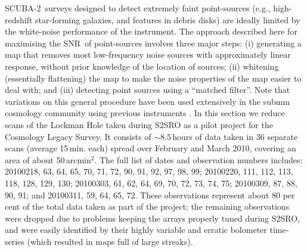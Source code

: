 \documentclass[useAMS,usenatbib,nofootinbib]{mn2e}
\newcommand{\snr}{SNR}
\newcommand{\scuba}{SCUBA-2}
\begin{document}
\scuba\ surveys designed to detect extremely faint point-sources
(e.g., high-redshift star-forming galaxies, and features in debris
disks) are ideally limited by the white-noise performance of the
instrument. The approach described here for maximising the \snr\ of
point-sources involves three major steps: (i) generating a map that
removes most low-frequency noise sources with approximately linear
response, without prior knowledge of the location of sources; (ii)
whitening (essentially flattening) the map to make the noise
properties of the map easier to deal with; and (iii) detecting point
sources using a ``matched filter''. Note that variations on this
general procedure have been used extensively in the submm cosmology
community using previous instruments
\citep[e.g.,][]{scott2002,borys2003,laurent2005,coppin2006,scott2008,perera2008,devlin2009}.
In this section we reduce scans of the Lockman Hole taken during S2SRO
as a pilot project for the Cosmology Legacy Survey. It consists of
$\sim8.5$\,hours of data taken in 36 separate scans (average
15\,min. each) spread over February and March 2010, covering an area
of about 50\,arcmin$^2$. The full list of dates and observation
numbers includes: 20100218, 63, 64, 65, 70, 71, 72, 90, 91, 92, 97,
98, 99; 20100220, 111, 112, 113, 118, 128, 129, 130; 20100303, 61, 62,
64, 69, 70, 72, 73, 74, 75; 20100309, 87, 88, 90, 91; and 20100311,
59, 64, 65, 72. These observations represent about 80 per cent of the
total data taken as part of the project; the remaining observations
were dropped due to problems keeping the arrays properly tuned during
S2SRO, and were easily identified by their highly variable and erratic
bolometer time-series (which resulted in maps full of large streaks).
\end{document}
